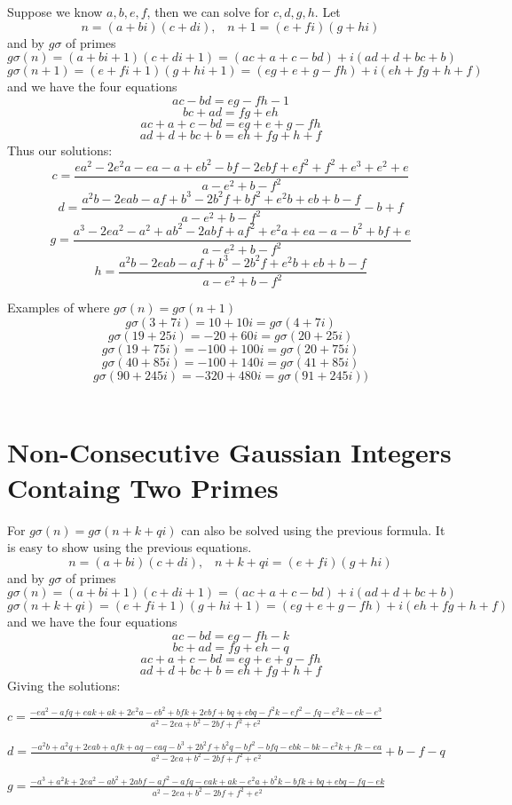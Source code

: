 \documentclass[12pt]{amsart}
\begin{document}
Suppose we know $a,b,e,f$, then we can solve for $c,d,g,h$.
Let $$n = (a + bi)(c+di), \; \; \; n+1 = (e + fi)(g + hi)$$ and by $g\sigma$ of primes  $$ g\sigma(n) = (a + bi + 1)(c + di + 1) = (ac + a + c -bd) + i(ad + d + bc + b)$$ $$ g\sigma(n+1) = (e + fi + 1)(g + hi + 1) = (eg + e + g - fh) + i(eh + fg + h + f)$$ and we have the four equations $$ac -bd = eg -fh - 1$$ $$bc + ad = fg + eh$$ $$ac + a + c -bd = eg + e + g - fh$$ $$ad + d + bc + b = eh + fg + h + f$$
Thus our solutions: 
$$c = \frac{ea^2 - 2e^2a -ea -a + eb^2 -bf -2ebf + ef^2 + f^2 + e^3 + e^2 + e} {a-e^2+b-f^2}$$ 
$$d = \frac{a^2b - 2eab -af +b^3 -2b^2f + bf^2 + e^2b + eb + b - f}{a-e^2 + b -f^2} -b + f$$ 
$$g = \frac{a^3 -2ea^2 - a^2 + ab^2 - 2abf + af^2 + e^2a + ea - a -b^2 + bf + e} {a-e^2+b-f^2}$$ 
$$h = \frac{a^2b - 2eab -af + b^3 - 2b^2f + e^2b + eb +b -f} {a-e^2+b-f^2}$$


Examples of where $g\sigma(n) = g\sigma(n+1)$
\\
$$g\sigma(3 + 7i) = 10 + 10i = g\sigma(4 + 7i)$$
$$g\sigma(19 + 25i) = -20 + 60i = g\sigma(20 + 25i)$$
$$g\sigma(19 + 75i) = -100 + 100i = g\sigma(20 + 75i)$$
$$g\sigma(40 + 85i) = -100 + 140i  = g\sigma(41 + 85i)$$
$$g\sigma(90 + 245i) = -320 + 480i  = g\sigma(91 + 245i))$$
\\

\section{Non-Consecutive Gaussian Integers Containg Two Primes}
For $g\sigma(n) = g\sigma(n+k+qi)$ can also be solved using the previous formula. It is easy to show using the previous equations. 
$$n = (a + bi)(c+di), \; \; \; n+k+qi = (e + fi)(g + hi)$$ and by $g\sigma$ of primes $$ g\sigma(n) = (a + bi + 1)(c + di + 1) = (ac + a + c -bd) + i(ad + d + bc + b)$$ $$ g\sigma(n+k+qi) = (e + fi + 1)(g + hi + 1) = (eg + e + g - fh) + i(eh + fg + h + f)$$ and we have the four equations $$ac -bd = eg -fh - k$$ $$bc + ad = fg + eh - q$$ $$ac + a + c -bd = eg + e + g - fh$$ $$ad + d + bc + b = eh + fg + h + f$$
Giving the solutions:

$c = \frac{-ea^2 -afq + eak + ak + 2e^2a -eb^2 + bfk + 2ebf + bq + ebq -f^2k -ef^2 -fq-e^2k -ek -e^3}{a^2-2ea+b^2-2bf+f^2+e^2}$

$d = \frac{-a^2b+a^2q+2eab+afk+aq-eaq-b^3+2b^2f+b^2q-bf^2-bfq-ebk-bk-e^2k+fk-ea}{a^2-2ea+b^2-2bf+f^2+e^2} +b -f -q$

$g =\frac{-a^3 + a^2k + 2ea^2-ab^2+2abf-af^2-afq-eak+ak-e^2a+b^2k-bfk+bq+ebq-fq-ek}{a^2-2ea+b^2-2bf+f^2+e^2}$
\end{document}
